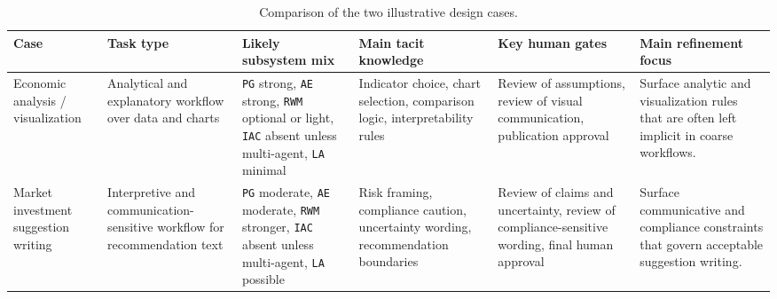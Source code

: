 \begin{table}[htbp]
\centering
\caption{Comparison of the two illustrative design cases.}
\begin{tabular}{p{3.2cm} p{3.2cm} p{4.2cm} p{4.6cm} p{4.2cm} p{4.6cm}}
\hline
\textbf{Case} & \textbf{Task type} & \textbf{Likely subsystem mix} & \textbf{Main tacit knowledge} & \textbf{Key human gates} & \textbf{Main refinement focus} \\
\hline
Economic analysis / visualization & Analytical and explanatory workflow over data and charts & \texttt{PG} strong, \texttt{AE} strong, \texttt{RWM} optional or light, \texttt{IAC} absent unless multi-agent, \texttt{LA} minimal & Indicator choice, chart selection, comparison logic, interpretability rules & Review of assumptions, review of visual communication, publication approval & Surface analytic and visualization rules that are often left implicit in coarse workflows. \\
Market investment suggestion writing & Interpretive and communication-sensitive workflow for recommendation text & \texttt{PG} moderate, \texttt{AE} moderate, \texttt{RWM} stronger, \texttt{IAC} absent unless multi-agent, \texttt{LA} possible & Risk framing, compliance caution, uncertainty wording, recommendation boundaries & Review of claims and uncertainty, review of compliance-sensitive wording, final human approval & Surface communicative and compliance constraints that govern acceptable suggestion writing. \\
\hline
\end{tabular}
\end{table}
